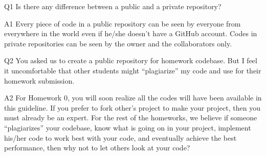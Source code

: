 \begin{qa}

\item[Q1] Is there any difference between a public and a private repository?

\item[A1] Every piece of code in a public repository can be seen by everyone
from everywhere in the world even if he/she doesn't have a GitHub account. Codes
in private repositories can be seen by the owner and the collaborators only.

\item[Q2] You asked us to create a public repository for homework codebase. But
I feel it uncomfortable that other students might ``plagiarize'' my code and use
for their homework submission.

\item[A2] For Homework 0, you will soon realize all the codes will have been
available in this guideline. If you prefer to fork other's project to make your
project, then you must already be an expert. For the rest of the homeworks, we
believe if someone ``plagiarizes'' your codebase, know what is going on in your
project, implement his/her code to work best with your code, and eventually
achieve the best performance, then why not to let others look at your code?

\end{qa}

